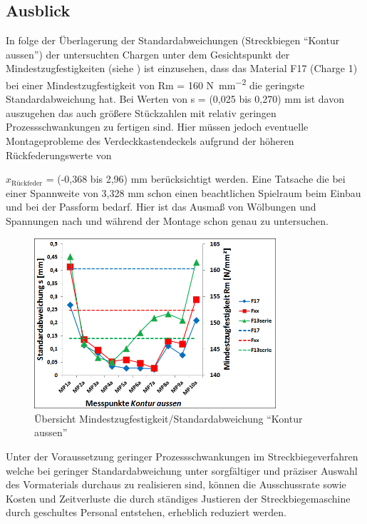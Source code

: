 \documentclass[12pt,a4paper,parskip]{scrartcl}
\begin{document}
\subsection{Ausblick}
In folge der Überlagerung der Standardabweichungen (Streckbiegen "`Kontur aussen"') der untersuchten Chargen unter dem Gesichtspunkt der Mindestzugfestigkeiten (siehe ) ist einzusehen, dass das Material F17 (Charge 1) bei einer Mindestzugfestigkeit von Rm = 160  \si{\newton\per\milli\meter\squared}  die geringste Standardabweichung hat. Bei Werten von s = (0,025  bis 0,270) \si{\milli\meter}  ist davon auszugehen das auch größere Stückzahlen mit relativ geringen Prozessschwankungen zu fertigen sind. Hier müssen jedoch eventuelle Montageprobleme des Verdeckkastendeckels aufgrund der höheren Rückfederungswerte von {$x_{\text{Rückfeder}}$ = (-0,368  bis 2,96) \si{\milli\meter} berücksichtigt werden. Eine Tatsache die bei einer Spannweite von 3,328 \si{\milli\meter} schon einen beachtlichen Spielraum beim Einbau und bei der Passform bedarf.  %
Hier ist das Ausmaß von Wölbungen und Spannungen nach und während der Montage schon genau zu untersuchen.

\begin{figure}[hbtp]
\centering
\includegraphics[width=0.8\textwidth]{standzugrel}
\caption{Übersicht Mindestzugfestigkeit/Standardabweichung "`Kontur aussen"'}
\label{fig:standzugrel}
\end{figure} 


Unter der Voraussetzung geringer Prozessschwankungen im Streckbiegeverfahren welche bei geringer Standardabweichung unter sorgfältiger und präziser Auswahl des Vormaterials durchaus zu realisieren sind, können die Ausschussrate sowie Kosten und Zeitverluste die durch ständiges Justieren der Streckbiegemaschine durch geschultes Personal entstehen, erheblich reduziert werden.

}
\end{document}
